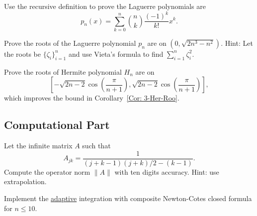 \begin{problem}
\label{Prb: 3-Exe-Lag}
    Use the recursive definition to prove the Laguerre polynomials are 
    \begin{equation}
        p_n(x) = \sum_{k=0}^n \binom{n}{k} \frac{(-1)^k}{k!} x^k.
    \end{equation}
\end{problem}
\begin{problem}
\label{Prb: 3-Exe-5}
    Prove the roots of the Laguerre polynomial $p_n$ are on $(0, \sqrt{2n^3 - n^2})$. Hint: Let the roots be $\{\zeta_i\}_{i=1}^n$ and use Vieta's formula to find $\sum_{i=1}^n \zeta_i^2$. 
\end{problem}

\begin{problem}
    Prove the roots of Hermite polynomial $H_n$ are on $$\left[-\sqrt{2n-2}\cos\left(\frac{\pi}{n+1}\right), \sqrt{2n-2}\cos\left(\frac{\pi}{n+1}\right)\right],$$ which improves the bound in Corollary~\ref{Cor: 3-Her-Roo}.
\end{problem}

\subsection{Computational Part}
\begin{problem}
    Let the infinite matrix $A$ such that $$A_{jk} = \frac{1}{(j+k-1)(j+k)/2 - (k-1)}.$$
    Compute the operator norm $\|A\|$ with ten digits accuracy. Hint: use extrapolation.
\end{problem}
\begin{problem}
    Implement the \underline{adaptive} integration with composite Newton-Cotes closed formula for $n \le 10$. 
\end{problem}


